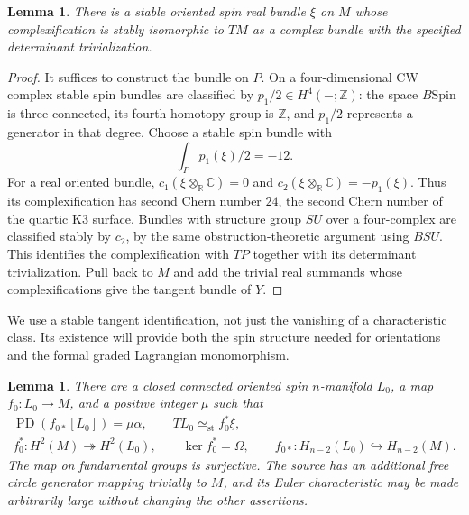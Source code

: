 \documentclass[11pt]{article}
\numberwithin{equation}{section}
\newtheorem{lemma}[theorem]{Lemma}
\theoremstyle{definition}
\theoremstyle{remark}
\begin{document}
\begin{lemma}\label{top:lem:real-form}
There is a stable oriented spin real bundle $\xi$ on $M$ whose
complexification is stably isomorphic to $TM$ as a complex bundle with
the specified determinant trivialization.
\end{lemma}

\begin{proof}
It suffices to construct the bundle on $P$.  On a four-dimensional CW
complex stable spin bundles are classified by $p_1/2\in H^4(-;\mathbb Z)$:
the space $B\mathrm{Spin}$ is three-connected, its fourth homotopy
group is $\mathbb Z$, and $p_1/2$ represents a generator in that degree.
Choose a stable spin bundle with
\[
        \int_Pp_1(\xi)/2=-12.
\]
For a real oriented bundle, $c_1(\xi\otimes_\mathbb R\mathbb C)=0$ and
$c_2(\xi\otimes_\mathbb R\mathbb C)=-p_1(\xi)$.  Thus its complexification has
second Chern number $24$, the second Chern number of the quartic K3
surface.  Bundles with structure group $SU$ over a four-complex are
classified stably by $c_2$, by the same obstruction-theoretic argument
using $BSU$.  This identifies the complexification with $TP$ together
with its determinant trivialization.  Pull back to $M$ and add the
trivial real summands whose complexifications give the tangent bundle
of $Y$.
\end{proof}

We use a stable tangent identification, not just the vanishing of a
characteristic class.  Its existence will provide both the spin structure
needed for orientations and the formal graded Lagrangian monomorphism.

\begin{lemma}\label{top:lem:source}
There are a closed connected oriented spin $n$-manifold $L_0$, a map
$f_0:L_0\to M$, and a positive integer $\mu$ such that
\begin{equation}\label{top:eq:source-properties}
 \begin{gathered}
 \operatorname{PD}(f_{0*}[L_0])=\mu\alpha,\qquad
 TL_0\simeq_{\mathrm{st}} f_0^*\xi,\\
 f_0^*:H^2(M)\twoheadrightarrow H^2(L_0),\qquad
 \ker f_0^*=\Omega,\qquad
 f_{0*}:H_{n-2}(L_0)\hookrightarrow H_{n-2}(M).
 \end{gathered}
\end{equation}
The map on fundamental groups is surjective.  The source has an
additional free circle generator mapping trivially to $M$, and its Euler
characteristic may be made arbitrarily large without changing the other
assertions.
\end{lemma}
\end{document}
